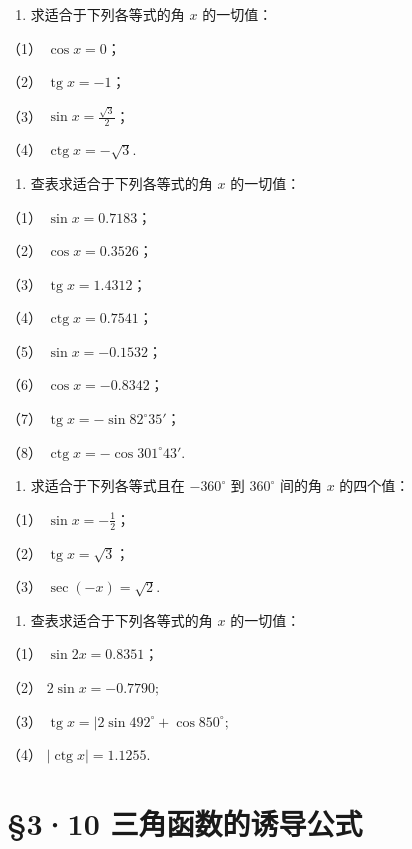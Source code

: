 \begin{enumerate}
\item
  求适合于下列各等式的角 \(x\) 的一切值：
\end{enumerate}

（1） \(\cos x = 0\)；

（2） \(\operatorname{tg} x = -1\)；

（3） \(\sin x = \frac{\sqrt{3}}{2}\)；

（4） \(\operatorname{ctg} x = -\sqrt{3}\).

\begin{enumerate}[start=2]
\item
  查表求适合于下列各等式的角 \(x\) 的一切值：
\end{enumerate}

（1） \(\sin x = 0.7183\)；

（2） \(\cos x = 0.3526\)；

（3） \(\operatorname{tg} x = 1.4312\)；

（4） \(\operatorname{ctg} x = 0.7541\)；

（5） \(\sin x = -0.1532\)；

（6） \(\cos x = -0.8342\)；

（7） \(\operatorname{tg} x = -\sin 82^{\circ}35'\)；

（8） \(\operatorname{ctg} x = -\cos 301^{\circ}43'\).

\begin{enumerate}[start=3]
\item
  求适合于下列各等式且在 \(-360^{\circ}\) 到 \(360^{\circ}\) 间的角
  \(x\) 的四个值：
\end{enumerate}

（1） \(\sin x = -\frac{1}{2}\)；

（2） \(\operatorname{tg} x = \sqrt{3}\)；

（3） \(\sec(-x) = \sqrt{2}\).

\begin{enumerate}[start=4]
\item
  查表求适合于下列各等式的角 \(x\) 的一切值：
\end{enumerate}

（1） \(\sin 2x = 0.8351\)；

（2） \(2\sin x = -0.7790;\)

（3） \(\operatorname{tg} x = |2\sin 492^{\circ} + \cos 850^{\circ};\)

（4） \(|\operatorname{ctg} x| = 1.1255\).

\section{§3·10 三角函数的诱导公式}

